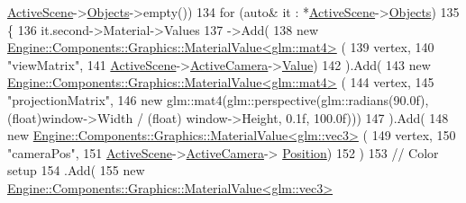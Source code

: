 \begin{DoxyCode}
      \mbox{\hyperlink{classEngine_1_1BaseEngine_adb3dbc839da9d821e08b18d8a221698d}{ActiveScene}}->\mbox{\hyperlink{classEngine_1_1Components_1_1Scene_a23481feabaaa56bf5613765db03af4da}{Objects}}->empty())
134         \textcolor{keywordflow}{for} (\textcolor{keyword}{auto}& it : *\mbox{\hyperlink{classEngine_1_1BaseEngine_adb3dbc839da9d821e08b18d8a221698d}{ActiveScene}}->\mbox{\hyperlink{classEngine_1_1Components_1_1Scene_a23481feabaaa56bf5613765db03af4da}{Objects}})
135         \{
136             it.second->Material->Values
137                 ->Add(
138                     \textcolor{keyword}{new} \mbox{\hyperlink{classEngine_1_1Components_1_1Graphics_1_1MaterialValue}{Engine::Components::Graphics::MaterialValue<glm::mat4>}}
      (
139                         vertex,
140                         \textcolor{stringliteral}{"viewMatrix"},
141                         \mbox{\hyperlink{classEngine_1_1BaseEngine_adb3dbc839da9d821e08b18d8a221698d}{ActiveScene}}->\mbox{\hyperlink{classEngine_1_1Components_1_1Scene_a9408befee37d89e2c001d25b9e4ed75a}{ActiveCamera}}->\mbox{\hyperlink{classEngine_1_1Components_1_1Camera_a5d131a78545d9f70496549946503b27a}{Value}})
142                 ).Add(
143                     \textcolor{keyword}{new} \mbox{\hyperlink{classEngine_1_1Components_1_1Graphics_1_1MaterialValue}{Engine::Components::Graphics::MaterialValue<glm::mat4>}}
      (
144                         vertex,
145                         \textcolor{stringliteral}{"projectionMatrix"},
146                         \textcolor{keyword}{new} glm::mat4(glm::perspective(glm::radians(90.0f), (\textcolor{keywordtype}{float})window->Width / (\textcolor{keywordtype}{float})
      window->Height, 0.1f, 100.0f)))
147                 ).Add(
148                     \textcolor{keyword}{new} \mbox{\hyperlink{classEngine_1_1Components_1_1Graphics_1_1MaterialValue}{Engine::Components::Graphics::MaterialValue<glm::vec3>}}
      (
149                         vertex,
150                         \textcolor{stringliteral}{"cameraPos"},
151                         \mbox{\hyperlink{classEngine_1_1BaseEngine_adb3dbc839da9d821e08b18d8a221698d}{ActiveScene}}->\mbox{\hyperlink{classEngine_1_1Components_1_1Scene_a9408befee37d89e2c001d25b9e4ed75a}{ActiveCamera}}->
      \mbox{\hyperlink{classEngine_1_1Components_1_1Camera_ab2c3ed9a1321a95db8fca95bc7f4b290}{Position}})
152                 )
153                 \textcolor{comment}{// Color setup}
154                 .Add(
155                     \textcolor{keyword}{new} \mbox{\hyperlink{classEngine_1_1Components_1_1Graphics_1_1MaterialValue}{Engine::Components::Graphics::MaterialValue<glm::vec3>}}

\end{DoxyCode}
